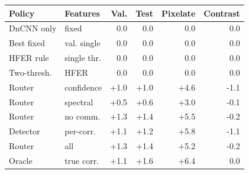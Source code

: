 \begin{tabular}{llrrrr}
\toprule
Policy & Features & Val. & Test & Pixelate & Contrast \\
\midrule
DnCNN only & fixed & 0.0 & 0.0 & 0.0 & 0.0 \\
Best fixed & val. single & 0.0 & 0.0 & 0.0 & 0.0 \\
HFER rule & single thr. & 0.0 & 0.0 & 0.0 & 0.0 \\
Two-thresh. & HFER & 0.0 & 0.0 & 0.0 & 0.0 \\
Router & confidence & +1.0 & +1.0 & +4.6 & -1.1 \\
Router & spectral & +0.5 & +0.6 & +3.0 & -0.1 \\
Router & no comm. & +1.3 & +1.4 & +5.5 & -0.2 \\
Detector & per-corr. & +1.1 & +1.2 & +5.8 & -1.1 \\
Router & all & +1.3 & +1.4 & +5.2 & -0.2 \\
Oracle & true corr. & +1.1 & +1.6 & +6.4 & 0.0 \\
\bottomrule
\end{tabular}
